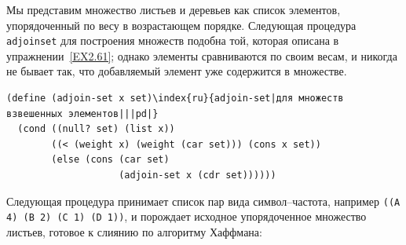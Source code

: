 Мы представим множество листьев и деревьев как список
элементов, упорядоченный по весу в возрастающем порядке.  Следующая
процедура {\tt adjoin\-set} для построения множеств подобна той,
которая описана в упражнении~\ref{EX2.61}; однако элементы
сравниваются по своим весам, и никогда не бывает так, что добавляемый
элемент уже содержится в множестве.

\begin{Verbatim}[fontsize=\small]
(define (adjoin-set x set)\index{ru}{adjoin-set|для множеств взвешенных элементов|||pd|}
  (cond ((null? set) (list x))
        ((< (weight x) (weight (car set))) (cons x set))
        (else (cons (car set)
                    (adjoin-set x (cdr set))))))
\end{Verbatim}

Следующая процедура принимает список пар вида
символ--частота, например {\tt ((A 4) (B 2) (C 1) (D 1))}, и
порождает исходное упорядоченное множество листьев, готовое к слиянию
по алгоритму Хаффмана:

